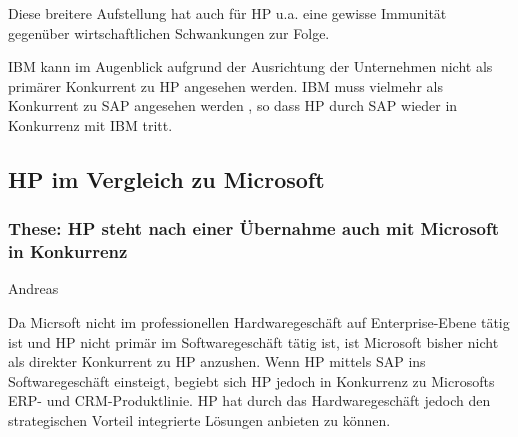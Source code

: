 \documentclass[a4paper,10pt,left=1.5cm,right=1.5cm,top=1.5cm,bottom=1.5cm]{article}
\begin{document}
Diese breitere Aufstellung hat auch für HP u.a. eine gewisse Immunität gegenüber wirtschaftlichen Schwankungen zur Folge.

IBM kann im Augenblick aufgrund der Ausrichtung der Unternehmen nicht als primärer Konkurrent zu HP angesehen werden.
IBM muss vielmehr als Konkurrent zu SAP angesehen werden \cite{ibmvssap}, so dass HP durch SAP wieder in Konkurrenz mit IBM tritt.

\subsection*{HP im Vergleich zu Microsoft}

\subsubsection*{These: HP steht nach einer Übernahme auch mit Microsoft in Konkurrenz}

Andreas

Da Micrsoft nicht im professionellen Hardwaregeschäft auf Enterprise-Ebene tätig ist und HP nicht primär im Softwaregeschäft tätig ist, ist Microsoft bisher nicht als direkter Konkurrent zu HP anzushen.
Wenn HP mittels SAP ins Softwaregeschäft einsteigt, begiebt sich HP jedoch in Konkurrenz zu Microsofts ERP- und CRM-Produktlinie.
HP hat durch das Hardwaregeschäft jedoch den strategischen Vorteil integrierte Lösungen anbieten zu können.

%
%
%
%
%
%
%
%
\end{document}
